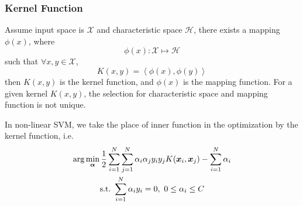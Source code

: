 \documentclass[12pt]{article}
\begin{document}
\subsubsection{Kernel Function}
Assume input space is $\mathcal{X}$ and characteristic space $\mathcal{H}$, there exists a mapping $\phi(x)$, where
\begin{equation}
    \phi(x): \mathcal{X} \mapsto \mathcal{H}
\end{equation}
such that $\forall x, y \in \mathcal{X}$,
\begin{equation}
    K(x,y) = \left\langle \phi(x),\phi(y) \right\rangle
\end{equation}
then $K(x, y)$ is the kernel function, and $\phi(x)$ is the mapping function. For a given kernel $K(x, y)$, the selection for characteristic space and mapping function is not unique. \par
In non-linear SVM, we take the place of inner function in the optimization by the kernel function, i.e.
\begin{gather}
    \arg \min_{\bm{\alpha}} \frac{1}{2}\sum_{i=1}^N \sum_{j=1}^N \alpha_i \alpha_j y_i y_j K(\bm{x}_i,\bm{x}_j) - \sum_{i=1}^N \alpha_i  \notag \\ \text{s.t.}~\sum_{i=1}^N \alpha_i y_i = 0,~0 \leq \alpha_i \leq C
\end{gather}
\end{document}
